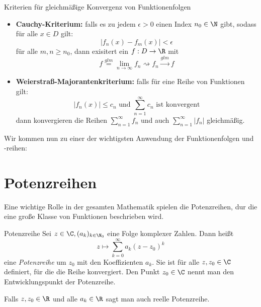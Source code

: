 \begin{satz}{Kriterien für gleichmäßige Konvergenz von Funktionenfolgen}
	\begin{itemize}
		\item \textbf{Cauchy-Kriterium:} falls es zu jedem $\epsilon>0$ einen Index $n_0\in\N$ gibt, sodass für alle $x\in D$ gilt:
		\begin{equation*}
			|f_n(x)-f_m(x)|<\epsilon
		\end{equation*}
		für alle $m,n\geq n_0$, dann exisitert ein $f: D\rightarrow\R$ mit
		\begin{equation*}
			f\overset{glm}=\lim\limits_{n\to\infty}f_n \rightsquigarrow f_n\overset{glm}\longrightarrow f
		\end{equation*}
		\item \textbf{Weierstraß-Majorantenkriterium:} falls für eine Reihe von Funktionen gilt:
		\begin{equation*}
			|f_n(x)|\leq c_n \text{ und } \sum\limits_{n=1}^\infty c_n \text{ ist konvergent}
		\end{equation*}
		dann konvergieren die Reihen $\sum\limits_{n=1}^\infty f_n$ und auch $\sum\limits_{n=1}^\infty |f_n|$ gleichmäßig.
	\end{itemize}
\end{satz}

Wir kommen nun zu einer der wichtigsten Anwendung der Funktionenfolgen und -reihen:
\section{Potenzreihen}
Eine wichtige Rolle in der gesamten Mathematik spielen die Potenzreihen, dur die eine große Klasse von Funktionen beschrieben wird.

\begin{definition}{Potenzreihe}
	Sei $z\in\C, (a_k)_{k\in\N_0}$ eine Folge komplexer Zahlen.
	Dann heißt
	\begin{equation*}
		z\mapsto \sum\limits_{k=0}^\infty a_k(z-z_0)^k
	\end{equation*}
	eine \emph{Potenzreihe} um $z_0$ mit den Koeffizienten $a_k$. Sie ist für alle $z,z_0\in\C$ definiert, für die die Reihe konvergiert.
	Den Punkt $z_0\in\C$ nennt man den Entwicklungspunkt der Potenzreihe.

	Falls $z,z_0\in\R$ und alle $a_k\in\R$ sagt man auch reelle Potenzreihe.
\end{definition}
